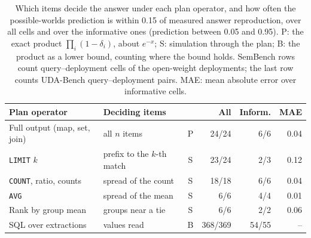 \begin{table}[t]
\caption{Which items decide the answer under each plan operator, and how often the possible-worlds prediction is within 0.15 of measured answer reproduction, over all cells and over the informative ones (prediction between 0.05 and 0.95). P: the exact product $\prod_i(1-\delta_i)$, about $e^{-x}$; S: simulation through the plan; B: the product as a lower bound, counting where the bound holds. SemBench rows count query--deployment cells of the open-weight deployments; the last row counts UDA-Bench query--deployment pairs. MAE: mean absolute error over informative cells.}
\label{tab:exposure}
\scriptsize
\setlength{\tabcolsep}{3pt}
\begin{tabular*}{\linewidth}{@{\extracolsep{\fill}}llcrrr@{}}
\toprule
Plan operator & Deciding items & & All & Inform. & MAE \\
\midrule
Full output (map, set, join) & all $n$ items & P & 24/24 & 6/6 & 0.04 \\
\texttt{LIMIT} $k$ & prefix to the $k$-th match & S & 23/24 & 2/3 & 0.12 \\
\texttt{COUNT}, ratio, counts & spread of the count & S & 18/18 & 6/6 & 0.04 \\
\texttt{AVG} & spread of the mean & S & 6/6 & 4/4 & 0.01 \\
Rank by group mean & groups near a tie & S & 6/6 & 2/2 & 0.06 \\
\midrule
SQL over extractions & values read & B & 368/369 & 54/55 & -- \\
\bottomrule
\end{tabular*}
\end{table}
